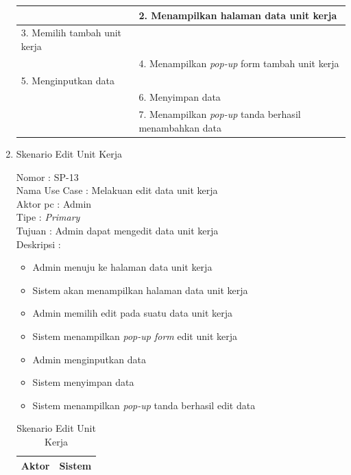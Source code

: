 \begin{enumerate}
\begin{table}
\begin{tabular}{ | l | p{65mm} |}
		&  2.	Menampilkan halaman data unit kerja \\
		
		\hline
		
		3. Memilih tambah unit kerja & \\
		
		\hline
		
		& 4.	Menampilkan \textit{pop-up} form tambah unit kerja \\
		
		\hline
		
		5.	Menginputkan data  & \\
		\hline
		
		& 6.	Menyimpan data \\
		\hline
		
		& 7.	Menampilkan \textit{pop-up} tanda berhasil menambahkan data \\
		\hline
		
	\end{tabular}
\end{table}

\item Skenario Edit Unit Kerja

Nomor \kern 3.6pc : SP-13 \\
Nama Use Case : Melakuan edit data unit kerja \\
Aktor  pc : Admin \\
Tipe \kern 4.6pc : \textit{Primary} \\
Tujuan \kern 3.6pc : Admin dapat mengedit data unit kerja \\
Deskripsi \kern 2.5pc : 

\begin{itemize}
	\item Admin menuju ke halaman data unit kerja
	\item Sistem akan menampilkan halaman data unit kerja
	\item Admin memilih edit pada suatu data unit kerja
	\item Sistem menampilkan \textit{pop-up form}  edit unit kerja
	\item Admin menginputkan data
	\item Sistem menyimpan data
	\item Sistem menampilkan \textit{pop-up} tanda berhasil edit data
	
\end{itemize}

\begin{table}
	\caption{Skenario Edit Unit Kerja}
	\centering
	\begin{tabular}{ | p{58mm} | p{70mm} |}
		\hline 
		\textbf{Aktor} & \textbf{Sistem} \\
		\hline
		

\end{tabular}
\end{table}
\end{enumerate}
